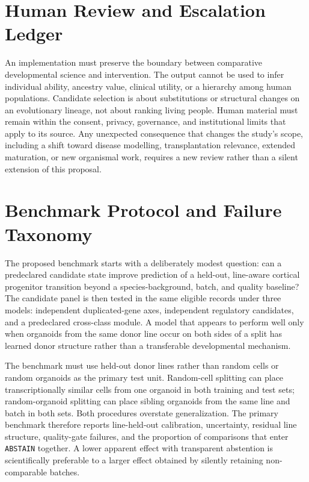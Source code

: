\documentclass[conference]{IEEEtran}
\newcommand{\abstain}{\texttt{ABSTAIN}}
\begin{document}
\section{Human Review and Escalation Ledger}

An implementation must preserve the boundary between comparative developmental science and intervention. The output cannot be used to infer individual ability, ancestry value, clinical utility, or a hierarchy among human populations. Candidate selection is about substitutions or structural changes on an evolutionary lineage, not about ranking living people. Human material must remain within the consent, privacy, governance, and institutional limits that apply to its source. Any unexpected consequence that changes the study's scope, including a shift toward disease modelling, transplantation relevance, extended maturation, or new organismal work, requires a new review rather than a silent extension of this proposal.

\section{Benchmark Protocol and Failure Taxonomy}

The proposed benchmark starts with a deliberately modest question: can a predeclared candidate state improve prediction of a held-out, line-aware cortical progenitor transition beyond a species-background, batch, and quality baseline? The candidate panel is then tested in the same eligible records under three models: independent duplicated-gene axes, independent regulatory candidates, and a predeclared cross-class module. A model that appears to perform well only when organoids from the same donor line occur on both sides of a split has learned donor structure rather than a transferable developmental mechanism.

The benchmark must use held-out donor lines rather than random cells or random organoids as the primary test unit. Random-cell splitting can place transcriptionally similar cells from one organoid in both training and test sets; random-organoid splitting can place sibling organoids from the same line and batch in both sets. Both procedures overstate generalization. The primary benchmark therefore reports line-held-out calibration, uncertainty, residual line structure, quality-gate failures, and the proportion of comparisons that enter \abstain{} together. A lower apparent effect with transparent abstention is scientifically preferable to a larger effect obtained by silently retaining non-comparable batches.
\end{document}

